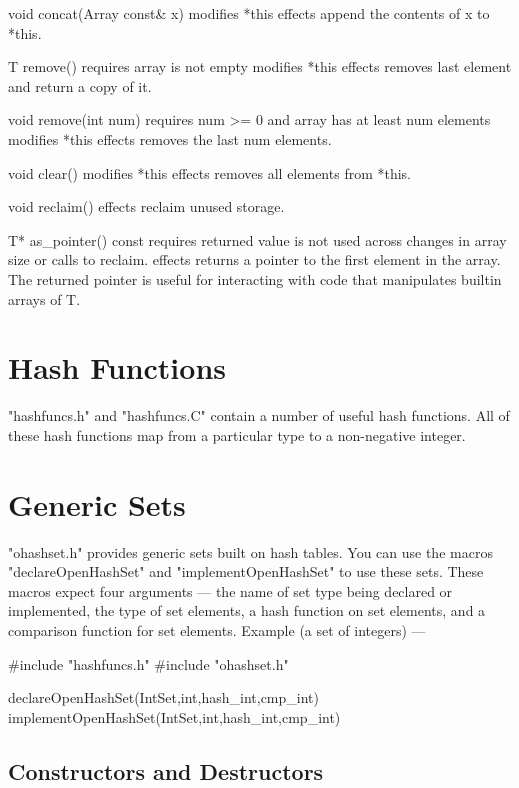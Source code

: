void concat(Array const& x)
    modifies   *this
    effects    append the contents of x to *this.

T remove()
    requires   array is not empty
    modifies   *this
    effects    removes last element and return a copy of it.

void remove(int num)
    requires   num >= 0 and array has at least num elements
    modifies   *this
    effects    removes the last num elements.

void clear()
    modifies   *this
    effects    removes all elements from *this.

void reclaim()
    effects    reclaim unused storage.

T* as_pointer() const
    requires   returned value is not used across changes in array size
               or calls to reclaim.
    effects    returns a pointer to the first element in the array.
               The returned pointer is useful for interacting with
               code that manipulates builtin arrays of T.

\section{Hash Functions}

"hashfuncs.h" and "hashfuncs.C" contain a number of useful hash functions.
All of these hash functions map from a particular type to a non-negative
integer.


\section{Generic Sets}

"ohashset.h" provides generic sets built on hash tables.
You can use the macros "declareOpenHashSet" and "implementOpenHashSet"
to use these sets.
These macros expect four arguments --- the name of set type being declared
or implemented, the type of set elements, a hash function on set elements,
and a comparison function for set elements.
Example (a set of integers) ---

#include "hashfuncs.h"
#include "ohashset.h"

declareOpenHashSet(IntSet,int,hash_int,cmp_int)
implementOpenHashSet(IntSet,int,hash_int,cmp_int)

\subsection{Constructors and Destructors}

